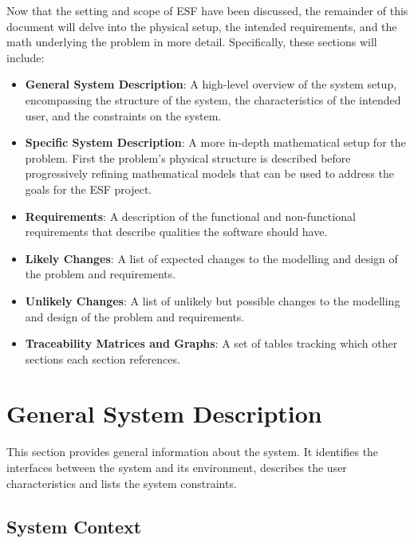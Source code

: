 \documentclass[12pt]{article}
\newcommand{\ProjectName}{ESF }
\begin{document}
Now that the setting and scope of \ProjectName have been discussed, the remainder of this document
will delve into the physical setup, the intended requirements, and the math underlying the problem in more detail.
Specifically, these sections will include:
\begin{itemize}
  \item \textbf{General System Description}: A high-level overview of the system setup, encompassing the structure of the system, the characteristics of the intended user, and the constraints on the system. 
  \item \textbf{Specific System Description}: A more in-depth mathematical setup for the problem. First the problem's physical structure is described before progressively refining mathematical models that can be used to address the goals for the \ProjectName project.
  \item \textbf{Requirements}: A description of the functional and non-functional requirements that describe qualities the software should have.
  \item \textbf{Likely Changes}: A list of expected changes to the modelling and design of the problem and requirements.
  \item \textbf{Unlikely Changes}: A list of unlikely but possible changes to the modelling and design of the problem and requirements.
  \item \textbf{Traceability Matrices and Graphs}: A set of tables tracking which other sections each section references.
\end{itemize}

\section{General System Description}

This section provides general information about the system.  It identifies the
interfaces between the system and its environment, describes the user
characteristics and lists the system constraints.

\subsection{System Context}
\end{document}
